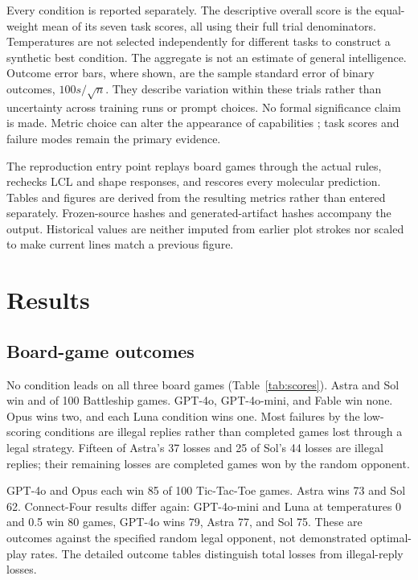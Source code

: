 \documentclass[12pt,letterpaper]{article}
\begin{document}
Every condition is reported separately. The descriptive overall score is the equal-weight mean of its seven task scores, all using their full trial denominators. Temperatures are not selected independently for different tasks to construct a synthetic best condition. The aggregate is not an estimate of general intelligence. Outcome error bars, where shown, are the sample standard error of binary outcomes, $100s/\sqrt{n}$. They describe variation within these trials rather than uncertainty across training runs or prompt choices. No formal significance claim is made. Metric choice can alter the appearance of capabilities \cite{schaeffer2023mirage}; task scores and failure modes remain the primary evidence.

The reproduction entry point replays board games through the actual rules, rechecks LCL and shape responses, and rescores every molecular prediction. Tables and figures are derived from the resulting metrics rather than entered separately. Frozen-source hashes and generated-artifact hashes accompany the output. Historical values are neither imputed from earlier plot strokes nor scaled to make current lines match a previous figure.

\section*{Results}


\subsection*{Board-game outcomes}
No condition leads on all three board games (Table~\ref{tab:scores}). Astra and Sol win \AstraBs{} and \SolBs{} of 100 Battleship games. GPT-4o, GPT-4o-mini, and Fable win none. Opus wins two, and each Luna condition wins one. Most failures by the low-scoring conditions are illegal replies rather than completed games lost through a legal strategy. Fifteen of Astra's 37 losses and 25 of Sol's 44 losses are illegal replies; their remaining losses are completed games won by the random opponent.

GPT-4o and Opus each win 85 of 100 Tic-Tac-Toe games. Astra wins 73 and Sol 62. Connect-Four results differ again: GPT-4o-mini and Luna at temperatures 0 and 0.5 win 80 games, GPT-4o wins 79, Astra 77, and Sol 75. These are outcomes against the specified random legal opponent, not demonstrated optimal-play rates. The detailed outcome tables distinguish total losses from illegal-reply losses.
\end{document}

